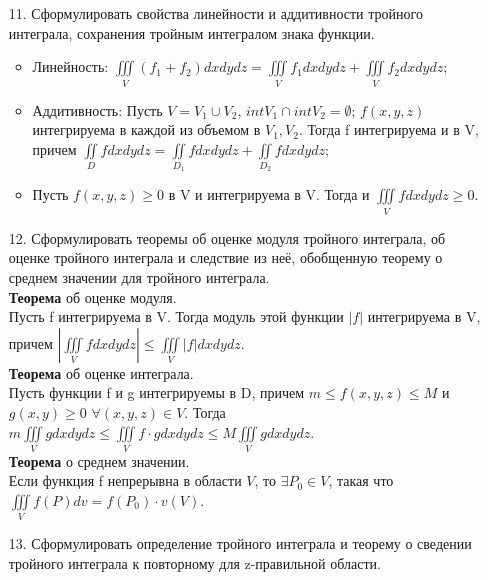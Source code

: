 \documentclass[a4paper]{article}
\begin{document}
\begin{enumerate}
\item[11.] Сформулировать свойства линейности и аддитивности тройного интеграла, сохранения тройным интегралом знака функции. \\

\begin{itemize}
\item Линейность: $\displaystyle  \iiint\limits_V (f_1 + f_2) dxdydz = \iiint\limits_V f_1 dxdydz + \iiint\limits_V f_2 dxdydz$; \\
\item Аддитивность: Пусть $V = V_1 \cup V_2$, $int V_1 \cap int V_2 = \emptyset$; $f(x,y,z)$ интегрируема в каждой из объемом в $V_1, V_2$. Тогда f интегрируема и в V, причем $\displaystyle  \iint\limits_D f dxdydz = \iint\limits_{D_1} f dxdydz + \iint\limits_{D_2} f dxdydz$; \\
\item Пусть $f(x,y,z) \geqslant 0$ в V и интегрируема в V. Тогда и $\displaystyle  \iiint\limits_V f dxdydz \geqslant 0$.
\end{itemize}


\item[12.] Сформулировать теоремы об оценке модуля тройного интеграла, об оценке тройного интеграла и следствие из неё, обобщенную теорему о среднем значении для тройного интеграла. \\

\textbf{Теорема} об оценке модуля. \\
Пусть f интегрируема в V. Тогда модуль этой функции $|f|$ интегрируема в V, причем $\displaystyle  \left| \iiint\limits_V f dxdydz \right| \leqslant \iiint\limits_V |f| dxdydz$. \\
\textbf{Теорема} об оценке интеграла. \\
Пусть функции f и g интегрируемы в D, причем $m \leqslant f(x,y,z) \leqslant M$ и $g(x,y) \geqslant 0$ $\forall (x,y,z) \in V$. Тогда $\displaystyle  m \iiint\limits_V g dxdydz \leqslant \iiint\limits_V f \cdot g dxdydz \leqslant M \iiint\limits_V g dxdydz$. \\
\textbf{Теорема} о среднем значении. \\
Если функция f непрерывна в области $V$, то $\exists P_0 \in V$, такая что $\displaystyle  \iiint\limits_V f(P) dv = f(P_0) \cdot v(V)$. \\


\item[13.] Сформулировать определение тройного интеграла и теорему о сведении тройного интеграла к повторному для z-правильной области. \\


\end{enumerate}
\end{document}
